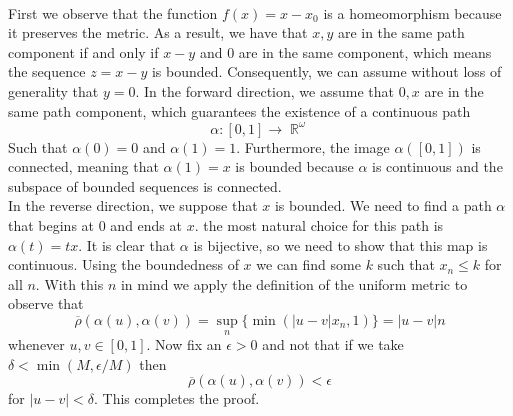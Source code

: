 \documentclass{article}
\DeclareMathOperator{\R}{\mathbb{R}}
\DeclareMathOperator{\lra}{\longrightarrow}
\newcommand{\problem}[1]{\noindent{\textbf{Problem #1}}\\}
\newcommand{\problempart}[1]{\noindent{\textbf{(#1)}}}
\begin{document}
\problem{3.25.2}
\problempart{b} First we observe that the function $f(x) = x - x_0$ is a homeomorphism because it preserves the metric. As a result, we have that $x,y$ are in the same path component if and only if $x-y$ and $0$ are in the same component, which means the sequence $z = x-y$ is bounded. Consequently, we can assume without loss of generality that $y = 0$. In the forward direction, we assume that $0,x$ are in the same path component, which guarantees the existence of a continuous path
\[
\alpha:[0,1] \lra \R^\omega
\]
Such that $\alpha(0) = 0$ and $\alpha(1) = 1$. Furthermore, the image $\alpha([0,1])$ is connected, meaning that $\alpha(1) = x$ is bounded because $\alpha$ is continuous and the subspace of bounded sequences is connected. \\
In the reverse direction, we suppose that $x$ is bounded. We need to find a path $\alpha$ that begins at 0 and ends at $x$. the most natural choice for this path is $\alpha(t) = tx$. It is clear that $\alpha$ is bijective, so we need to show that this map is continuous. Using the boundedness of $x$ we can find some $k$ such that $x_n \leq k$ for all $n$. With this $n$ in mind we apply the definition of the uniform metric to observe that 
\[
\overline{\rho}(\alpha(u), \alpha(v)) = \sup_n\{\min(|u-v|x_n, 1)\} = |u - v|n
\]
whenever $u,v \in [0,1]$. Now fix an $\epsilon > 0$ and not that if we take $\delta < \min(M,\epsilon/M)$ then 
\[
\overline{\rho}(\alpha(u), \alpha(v)) < \epsilon
\]
for $|u - v| < \delta $. This completes the proof. 
\end{document}
